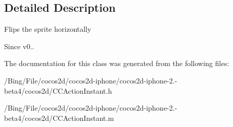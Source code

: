 \subsection{Detailed Description}
Flips the sprite horizontally \begin{DoxySince}{Since}
v0.. 
\end{DoxySince}


The documentation for this class was generated from the following files\-:\begin{DoxyCompactItemize}
\item 
/\-Bing/\-File/cocos2d/cocos2d-\/iphone/cocos2d-\/iphone-\/2.-\/beta4/cocos2d/C\-C\-Action\-Instant.\-h\item 
/\-Bing/\-File/cocos2d/cocos2d-\/iphone/cocos2d-\/iphone-\/2.-\/beta4/cocos2d/C\-C\-Action\-Instant.\-m\end{DoxyCompactItemize}
